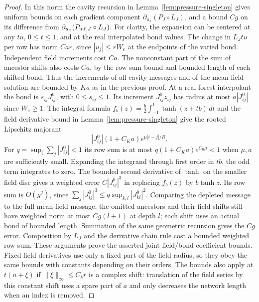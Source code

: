 \documentclass[11pt]{article}
\theoremstyle{definition}
\begin{document}
\begin{proof}
In this norm the cavity recursion in Lemma~\ref{lem:pressure-singleton}
gives uniform bounds on each gradient component
\(\partial_{u_x}(P_J\circ L_J)\), and a bound \(Cg\) on its
difference from \(\partial_{u_x}(P_{{\rm mf},J}\circ L_J)\).
For clarity, the expansion can be centered at any \(t u\),
\(0\le t\le1\), and at the real interpolated bond values.
The change in \(L_J t u\) per row has norm \(Ca r\), since
\(|u_j|\le r W_e\) at the endpoints of the varied bond.
Independent field increments cost \(Ca\). The nonconstant part
of the sum of ancestor shifts also costs \(Ca\), by the row sum
bound and bounded length of each shifted bond. Thus the increments
of all cavity messages and of the mean-field solution are bounded
by \(K a\) as in the previous proof.
At a real forest interpolant the bond is \(s_{ij}J^0_{ij}\), with
\(0\le s_{ij}\le1\). Its increment \(J^0_{ij}z_{ij}\) has radius
at most \(a|J^0_{ij}|\) since \(W_e\ge1\). The integral formula
\(f_b(z)=\tfrac b2\int_{-1}^1\tanh(z+t b)\,dt\) and the field
derivative bound in Lemma~\ref{lem:pressure-singleton} give the
rooted Lipschitz majorant
\begin{equation}
 |J^0_{ij}|(1+C_K a)e^{\mu |i-j|/R}.
\end{equation}
For \(q=\sup_i\sum_j|J^0_{ij}|<1\) its row sum is at most
\(q(1+C_K a)e^{C_0\mu}<1\) when \(\mu,a\) are sufficiently small.
Expanding the integrand through first order in \(t b\), the odd
term integrates to zero. The bounded second derivative of \(\tanh\)
on the smaller field disc gives a weighted error \(C|J^0_{ij}|^3\)
in replacing \(f_b(z)\) by \(b\tanh z\). Its row sum is
\(O(g^2)\), since \(\sum_j|J^0_{ij}|^3\le q\sup_{k,l}|J^0_{kl}|^2\).
Comparing the depleted message to the
full mean-field message, the omitted ancestors and their field
shifts still have weighted norm at most \(Cg(l+1)\) at depth
\(l\); each shift uses an actual bond of bounded length.
Summation of the same geometric recursion gives the \(Cg\) error.
Composition by \(L_J\) and the derivative chain rule cost a
bounded weighted row sum. These arguments prove the asserted
joint field/bond coefficient bounds. Fixed field derivatives
use only a fixed part of the field radius, so they obey the
same bounds with constants depending on their orders. The bounds
also apply at \(t(u+\xi)\) if \(\|\xi\|_\infty\le C_k r\) is a
complex shift: translation of the field series by this constant
shift uses a spare part of \(a\) and only decreases the network
length when an index is removed.


\end{proof}
\end{document}
